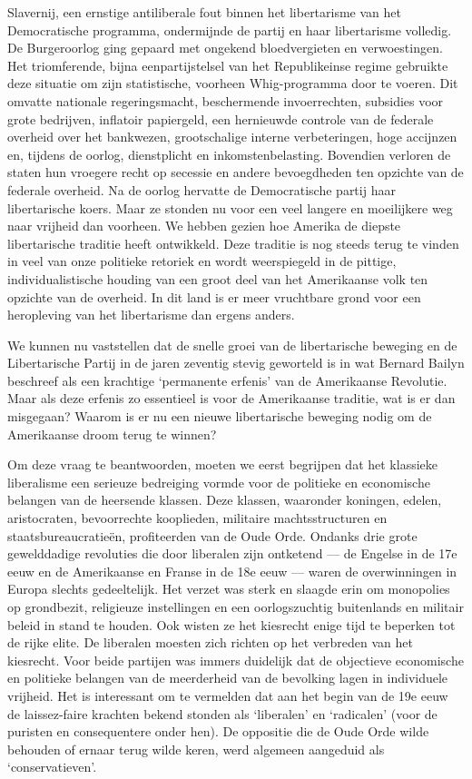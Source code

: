 \documentclass[
  a5paper,
  smalldemyvopaper,10pt,twoside,onecolumn,openright,extrafontsizes,hidelinks]{memoir}
\begin{document}
Slavernij, een ernstige antiliberale fout binnen het libertarisme van
het Democratische programma, ondermijnde de partij en haar libertarisme
volledig. De Burgeroorlog ging gepaard met ongekend bloedvergieten en
verwoestingen. Het triomferende, bijna eenpartijstelsel van het
Republikeinse regime gebruikte deze situatie om zijn statistische,
voorheen Whig-programma door te voeren. Dit omvatte nationale
regeringsmacht, beschermende invoerrechten, subsidies voor grote
bedrijven, inflatoir papiergeld, een hernieuwde controle van de federale
overheid over het bankwezen, grootschalige interne verbeteringen, hoge
accijnzen en, tijdens de oorlog, dienstplicht en inkomstenbelasting.
Bovendien verloren de staten hun vroegere recht op secessie en andere
bevoegdheden ten opzichte van de federale overheid. Na de oorlog
hervatte de Democratische partij haar libertarische koers. Maar ze
stonden nu voor een veel langere en moeilijkere weg naar vrijheid dan
voorheen. We hebben gezien hoe Amerika de diepste libertarische traditie
heeft ontwikkeld. Deze traditie is nog steeds terug te vinden in veel
van onze politieke retoriek en wordt weerspiegeld in de pittige,
individualistische houding van een groot deel van het Amerikaanse volk
ten opzichte van de overheid. In dit land is er meer vruchtbare grond
voor een heropleving van het libertarisme dan ergens anders.

We kunnen nu vaststellen dat de snelle groei van de libertarische
beweging en de Libertarische Partij in de jaren zeventig stevig
geworteld is in wat Bernard Bailyn beschreef als een krachtige
`permanente erfenis' van de Amerikaanse Revolutie. Maar als deze erfenis
zo essentieel is voor de Amerikaanse traditie, wat is er dan misgegaan?
Waarom is er nu een nieuwe libertarische beweging nodig om de
Amerikaanse droom terug te winnen?

Om deze vraag te beantwoorden, moeten we eerst begrijpen dat het
klassieke liberalisme een serieuze bedreiging vormde voor de politieke
en economische belangen van de heersende klassen. Deze klassen,
waaronder koningen, edelen, aristocraten, bevoorrechte kooplieden,
militaire machtsstructuren en staatsbureaucratieën, profiteerden van de
Oude Orde. Ondanks drie grote gewelddadige revoluties die door liberalen
zijn ontketend --- de Engelse in de 17e eeuw en de Amerikaanse en Franse
in de 18e eeuw --- waren de overwinningen in Europa slechts
gedeeltelijk. Het verzet was sterk en slaagde erin om monopolies op
grondbezit, religieuze instellingen en een oorlogszuchtig buitenlands en
militair beleid in stand te houden. Ook wisten ze het kiesrecht enige
tijd te beperken tot de rijke elite. De liberalen moesten zich richten
op het verbreden van het kiesrecht. Voor beide partijen was immers
duidelijk dat de objectieve economische en politieke belangen van de
meerderheid van de bevolking lagen in individuele vrijheid. Het is
interessant om te vermelden dat aan het begin van de 19e eeuw de
laissez-faire krachten bekend stonden als `liberalen' en `radicalen'
(voor de puristen en consequentere onder hen). De oppositie die de Oude
Orde wilde behouden of ernaar terug wilde keren, werd algemeen aangeduid
als `conservatieven'.
\end{document}
